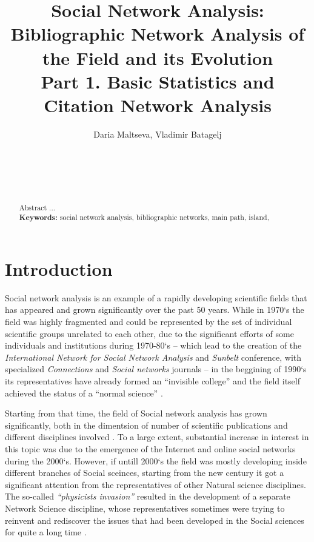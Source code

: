 \documentclass[11pt]{article} %
\title{\LARGE\textbf{Social Network Analysis:}\protect\\ Bibliographic Network Analysis of the Field and its Evolution \\ Part 1. Basic Statistics and Citation Network Analysis}
\author{%
Daria Maltseva\affmark[1], Vladimir Batagelj\affmark[1,2,3]\\
\affaddr{\affmark[1]NRU HSE Moscow}\\
\affaddr{\affmark[2]IMFM Ljubljana}\\
\affaddr{\affmark[3]IAM UP Koper}\\ \email{dmaltseva@hse.ru}\\
\email{vladimir.batagelj@fmf.uni-lj.si} %
}
\newcommand{\Remark}[1]{\ifodd\value{page} \normalmarginpar
 \else \reversemarginpar \fi \marginpar{{\footnotesize #1}} }
\begin{document}

\maketitle

\begin{abstract}
Abstract ...
\\[4pt]
\textbf{Keywords:}  social network analysis, bibliographic networks, main path,  island,
\end{abstract}



\section{Introduction}

Social network analysis is an example of a rapidly developing scientific fields that has appeared and grown significantly over the past 50 years. While in 1970`s the field was highly fragmented and could be represented by the set of individual scientific groups unrelated to each other, due to the significant efforts of some individuals and institutions during 1970-80`s -- which lead to the creation of the \textit{International Network for Social Network Analysis} and \textit{Sunbelt} conference, with specialized \textit{Connections} and \textit{Social networks} journals -- in the beggining of 1990`s its representatives have already formed an “invisible college” and the field itself achieved the status of a “normal science” \citep{SNAdev,normSci}. \medskip 

Starting from that time, the field of Social network analysis has grown significantly, both in the dimentsion of number of  scientific publications and different disciplines involved \citep{SNAinf, borgatti}. To a large extent, substantial increase in interest in this topic was due to the emergence of the Internet and online social networks during the 2000`s. However, if untill 2000`s the field was mostly developing inside different branches of Social sceinces, starting from the new century it got a significant attention from the representatives of other Natural science disciplines. The so-called \textit{``physicists invasion''}  \citep{Understand}\Remark{Who proposed the term?} resulted in the development of a separate Network Science discipline, whose representatives sometimes were trying to reinvent and rediscover the issues that had been developed in the Social sciences for quite a long time \citep{SNAdev}.  \medskip 
 
\end{document}
